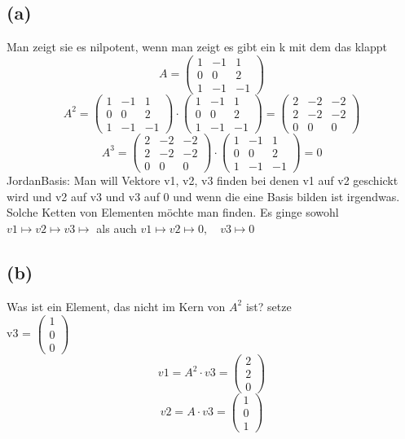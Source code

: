 \documentclass{article} %
\begin{document}
\subsection*{(a)}
Man zeigt sie es nilpotent, wenn man zeigt es gibt ein k mit dem das klappt 
\[
A = \begin{pmatrix}
1& -1& 1\\0 & 0 & 2 \\ 1&-1&-1
\end{pmatrix}
\]
\[
A^2 = \begin{pmatrix}
1& -1& 1\\0 & 0 & 2 \\ 1&-1&-1
\end{pmatrix} \cdot \begin{pmatrix}
1& -1& 1\\0 & 0 & 2 \\ 1&-1&-1
\end{pmatrix} = \begin{pmatrix}
2 & -2 & -2 \\ 2 & -2 & -2 \\ 0 & 0 & 0 
\end{pmatrix}
\]
\[
A^3 = \begin{pmatrix}
2 & -2 & -2 \\ 2 & -2 & -2 \\ 0 & 0 & 0 
\end{pmatrix} \cdot \begin{pmatrix}
1& -1& 1\\0 & 0 & 2 \\ 1&-1&-1
\end{pmatrix} = 0
\] 
JordanBasis: Man will Vektore v1, v2, v3 finden bei denen v1 auf v2 geschickt wird und v2 auf v3 und v3 auf 0 und wenn die eine Basis bilden ist irgendwas. \\
Solche Ketten von Elementen möchte man finden. Es ginge sowohl $v1 \mapsto v2 \mapsto v3 \mapsto$ als auch $v1 \mapsto v2 \mapsto 0, \quad v3 \mapsto 0$
\subsection*{(b)}
Was ist ein Element, das nicht im Kern von $A^2$ ist? setze \\
v3 = $\begin{pmatrix}
1\\0\\0
\end{pmatrix}$
\[v1 = A^2 \cdot v3 = \begin{pmatrix}
2\\2\\0
\end{pmatrix}\]
\[v2 = A \cdot v3 = \begin{pmatrix}
1\\0\\1
\end{pmatrix}\]
\end{document}

